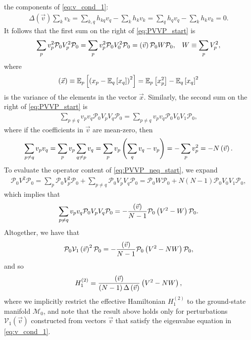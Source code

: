 \documentclass[nofootinbib,notitlepage,11pt]{revtex4-2}
\newcommand{\f}[2]{\dfrac{#1}{#2}} %
\newcommand{\p}[1]{\left(#1\right)} %
\renewcommand{\sp}[1]{\left[#1\right]} %
\renewcommand{\v}{\vec} %
\newcommand{\1}{\mathds{1}}
\newcommand{\M}{\mathcal{M}}
\renewcommand{\P}{\mathcal{P}}
\newcommand{\V}{\mathcal{V}}
\newcommand{\EE}{\mathbb{E}}
\let\var\relax
\DeclareMathOperator{\var}{var}
\begin{document}
the components of \eqref{eq:v_cond_1}:
\begin{align}
  \Delta\p{\v v} \sum_k v_k
  = \sum_{k,q} h_{kq} v_q - \sum_k h_k v_k
  = \sum_q h_q v_q - \sum_k h_k v_k
  = 0.
  \label{eq:D_v_0}
\end{align}
It follows that the first sum on the right of \eqref{eq:PVVP_start} is
\begin{align}
  \sum_p v_p^2 \P_0 V_p^2 \P_0
  = \sum_p v_p^2 \P_0 V_0^2 \P_0
  = \var\p{\v v} \P_0 W \P_0,
  &&
  W \equiv \sum_p V_p^2,
\end{align}
where
\begin{align}
  \var\p{\v x} \equiv \EE_p\sp{\p{x_p-\EE_q\sp{x_q}}^2}
  = \EE_p\sp{x_p^2} - \EE_q\sp{x_q}^2
\end{align}
is the variance of the elements in the vector $\v x$.  Similarly, the
second sum on the right of \eqref{eq:PVVP_start} is
\begin{align}
  \sum_{p\ne q} v_p v_q \P_0 V_p V_q \P_0
  = \sum_{p\ne q} v_p v_q \P_0 V_0 V_1 \P_0,
  \label{eq:PVVP_neq_start}
\end{align}
where if the coefficients in $\v v$ are mean-zero, then
\begin{align}
  \sum_{p\ne q} v_p v_q
  = \sum_p v_p \sum_{q\ne p} v_q
  = \sum_p v_p \p{\sum_q v_q - v_p}
  = - \sum_p v_p^2
  = - N \var\p{\v v}.
\end{align}
To evaluate the operator content of \eqref{eq:PVVP_neq_start}, we
expand
\begin{align}
  \P_0 V^2 \P_0
  = \sum_p \P_0 V_p^2 \P_0
  + \sum_{p\ne q} \P_0 V_p V_q \P_0
  = \P_0 W \P_0 + N \p{N-1} \P_0 V_0 V_1 \P_0,
  \label{eq:PVVP_neq_ops}
\end{align}
which implies that
\begin{align}
  \sum_{p\ne q} v_p v_q \P_0 V_p V_q \P_0
  = -\f{\var\p{\v v}}{N-1}\P_0\p{V^2 - W} \P_0.
  \label{eq:PVVP_neq}
\end{align}
Altogether, we have that
\begin{align}
  \P_0 \V_1\p{\v v}^2 \P_0
  = -\f{\var\p{\v v}}{N-1} \P_0 \p{V^2 - N W} \P_0,
\end{align}
and so
\begin{align}
  H_1^{(2)} = \f{\var\p{\v v}}{\p{N-1}\Delta\p{\v v}} \p{V^2 - N W},
\end{align}
where we implicitly restrict the effective Hamiltonian $H_1^{(2)}$ to
the ground-state manifold $\M_0$, and note that the result above holds
only for perturbations $\V_1\p{\v v}$ constructed from vectors $\v v$
that satisfy the eigenvalue equation in \eqref{eq:v_cond_1}.
\end{document}
